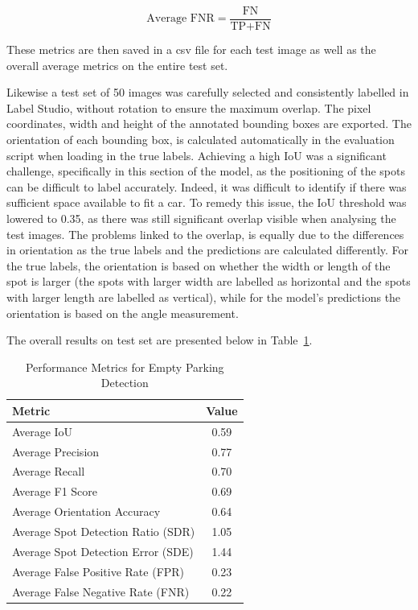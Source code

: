 \[
\text{Average FNR} = \frac{\text{FN}}{\text{TP} + \text{FN}}
\]

These metrics are then saved in a csv file for each test image as well as the overall average metrics on the entire test set.

Likewise a test set of 50 images was carefully selected and consistently labelled in Label Studio, without rotation to ensure the maximum overlap. The pixel coordinates, width and height of the annotated bounding boxes are exported. The orientation of each bounding box, is calculated automatically in the evaluation script when loading in the true labels.
Achieving a high IoU was a significant challenge, specifically in this section of the model, as the positioning of the spots can be difficult to label accurately. Indeed, it was difficult to identify if there was sufficient space available to fit a car.
To remedy this issue, the IoU threshold was lowered to 0.35, as there was still significant overlap visible when analysing the test images.
The problems linked to the overlap, is equally due to the differences in orientation as the true labels and the predictions are calculated differently.
For the true labels, the orientation is based on whether the width or length of the spot is larger (the spots with larger width are labelled as horizontal and the spots with larger length are labelled as vertical), while for the model's predictions the orientation is based on the angle measurement.

The overall results on test set are presented below in Table~\ref{tab:metrics2}.

\begin{table}[htbp]
    \centering
    \begin{tabular}{|l|c|}
    \hline
    \textbf{Metric}                            & \textbf{Value} \\ \hline
    Average IoU                                & 0.59           \\ \hline
    Average Precision                          & 0.77           \\ \hline
    Average Recall                             & 0.70           \\ \hline
    Average F1 Score                           & 0.69           \\ \hline
    Average Orientation Accuracy               & 0.64           \\ \hline
    Average Spot Detection Ratio (SDR)         & 1.05           \\ \hline
    Average Spot Detection Error (SDE)         & 1.44           \\ \hline
    Average False Positive Rate (FPR)          & 0.23           \\ \hline
    Average False Negative Rate (FNR)          & 0.22           \\ \hline
    \end{tabular}
    \caption{Performance Metrics for Empty Parking Detection}
    \label{tab:metrics2}
\end{table}

